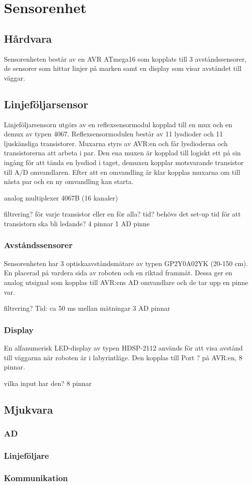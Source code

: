 \section{Sensorenhet}

\subsection{Hårdvara}
Sensorenheten består av en AVR ATmega16 som kopplats till 3 avståndssensorer, de sensorer som hittar linjer på marken samt en display som visar avståndet till väggar. 

\subsection{Linjeföljarsensor}
Linjeföljarsensorn utgörs av en reflexsensormodul kopplad till en mux och en demux av typen 4067. Reflexsensormodulen består av 11 lysdioder och 11 ljuskänsliga transistorer.  Muxarna styrs av AVR:en och får lysdioderna och transistorerna att arbeta i par. Den ena muxen är kopplad till logiskt ett på sin ingång för att tända en lysdiod i taget, demuxen kopplar motsvarande transistor till A/D omvandlaren. Efter att en omvandling är klar kopplas muxarna om till nästa par och en ny omvandling kan starta.

analog multiplexer 4067B (16 kanaler)

filtrering? för varje transistor eller en för alla?
tid? behövs det set-up tid för att transistorn ska bli ledande?
4 pinnar
1 AD pinne

\subsubsection{Avståndssensorer}
Sensorenheten har 3 optiskaavståndsmätare av typen GP2Y0A02YK (20-150 cm). En placerad på vardera sida av roboten och en riktad frammåt. Dessa ger en analog utsignal som kopplas till AVR:ens AD omvandlare och de tar upp en pinne var.

filtrering?
Tid: ca 50 ms mellan mätningar
3 AD pinnar

\subsubsection{Display}
En alfanumerisk LED-display av typen HDSP-2112 används för att visa avstånd till väggarna när roboten är i labyrintläge. Den kopplas till Port ? på AVR:en, 8 pinnar.

vilka input har den?
8 pinnar

\subsection{Mjukvara}


\subsubsection{AD}

\subsubsection{Linjeföljare}


\subsubsection{Kommunikation}